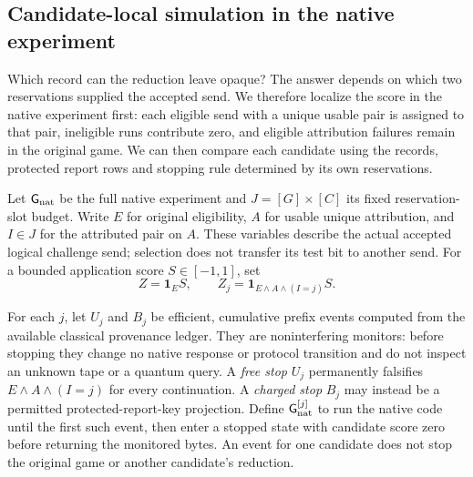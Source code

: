 \subsection{Candidate-local simulation in the native experiment}
\label{sec:candidate-local-accounting}

Which record can the reduction leave opaque? The answer depends on
which two reservations supplied the accepted send. We therefore localize
the score in the native experiment first: each eligible send with a unique
usable pair is assigned to that pair, ineligible runs contribute zero,
and eligible attribution failures remain in the original game. We can then
compare each candidate using the records, protected report rows
and stopping rule determined by its own reservations.

Let $\mathsf G_{\rm nat}$ be the full native experiment and
$J=[G]\times[C]$ its fixed reservation-slot budget.  Write $E$ for original
eligibility, $A$ for usable unique attribution, and $I\in J$ for the attributed
pair on $A$.  These variables describe the actual accepted logical challenge
send; selection does not transfer its test bit to another send.  For a bounded
application score $S\in[-1,1]$, set
\[
 Z=\mathbf1_E S,\qquad
 Z_j=\mathbf1_{E\land A\land(I=j)}S.
\]

For each $j$, let $U_j$ and $B_j$ be efficient, cumulative prefix events
computed from the available classical provenance ledger.  They are
noninterfering monitors: before stopping they change no native response or
protocol transition and do not inspect an unknown tape or a quantum query.
A \emph{free stop} $U_j$ permanently falsifies $E\land A\land(I=j)$ for every
continuation.  A \emph{charged stop} $B_j$ may instead be a permitted
protected-report-key projection.  Define $\mathsf G_{\rm nat}^{[j]}$ to run
the native code until the first such event, then enter a stopped state with
candidate score zero before returning the monitored bytes.  An event for one
candidate does not stop the original game or another candidate's reduction.

